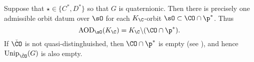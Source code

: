 \documentclass[ssunip.tex]{subfiles}
\begin{document}
\begin{remark}
Suppose that $\star\in \{C^*, D^*\}$ so that $G$ is quaternionic.
Then there is  precisely one admissible orbit datum over  $\sO$ for each $K_\C$-orbit $\sO\subset \CO\cap \p^*$.
Thus
\[
 \mathrm{AOD}_{\sO}(K_\C)=K_\C\backslash  (\CO\cap \p^*).
\]
If $\check \CO$ is not quasi-distinghuished, then
$\CO\cap \p^*$ is empty (see \cite[Theorems 9.3.4 and 9.3.5]{CM}), and hence $\mathrm{Unip}_{\check \CO}(G)$ is also empty.


\end{remark}
\end{document}
